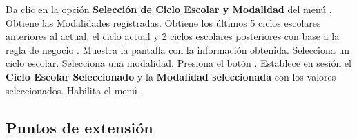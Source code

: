 \begin{UCtrayectoria}	

    \UCpaso[\UCactor] Da clic en la opción \textbf{Selección de Ciclo Escolar y Modalidad} del menú  .
    \UCpaso Obtiene las Modalidades registradas.
    \UCpaso Obtiene los últimos 5 ciclos escolares anteriores al actual, el ciclo actual y 2 ciclos escolares posteriores con base a la regla de negocio .
    \UCpaso Muestra la pantalla  con la información obtenida.
    \UCpaso [\UCactor] Selecciona un ciclo escolar.
    \UCpaso [\UCactor] Selecciona una modalidad.
    \UCpaso [\UCactor] \label{DAE-IN-CU1:acp} Presiona el botón . 
    \UCpaso Establece en sesión el {\bf Ciclo Escolar Seleccionado} y la {\bf Modalidad seleccionada} con los valores seleccionados.
    \UCpaso Habilita el menú .
    
\end{UCtrayectoria}


\subsection{Puntos de extensión}



